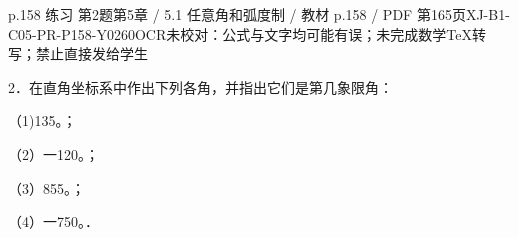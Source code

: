 \begin{bankitem}{p.158 练习 第2题}{第5章 / 5.1 任意角和弧度制 / 教材 p.158 / PDF 第165页}{XJ-B1-C05-PR-P158-Y0260}{OCR未校对：公式与文字均可能有误；未完成数学TeX转写；禁止直接发给学生}
\begin{ocrdraft}
\par
2．在直角坐标系中作出下列各角，并指出它们是第几象限角：
\par
（1)135。；
\par
（2）一120。；
\par
（3）855。；
\par
（4）一750。．
\end{ocrdraft}
\end{bankitem}
